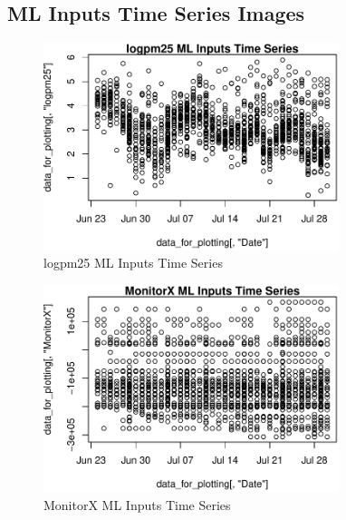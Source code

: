 
\subsection{ML Inputs Time Series Images} 
 

\begin{figure} 
\centering  
\includegraphics[width=0.77\textwidth]{Code_Outputs/ML_input_report_AllforCaret_cleaned_StepPractice_part_practice_logpm25TS.pdf} 
\caption{\label{fig:ML_input_report_AllforCaret_cleaned_StepPractice_part_practicelogpm25TS}logpm25 ML Inputs Time Series} 
\end{figure} 
 

\begin{figure} 
\centering  
\includegraphics[width=0.77\textwidth]{Code_Outputs/ML_input_report_AllforCaret_cleaned_StepPractice_part_practice_MonitorXTS.pdf} 
\caption{\label{fig:ML_input_report_AllforCaret_cleaned_StepPractice_part_practiceMonitorXTS}MonitorX ML Inputs Time Series} 
\end{figure} 
 

